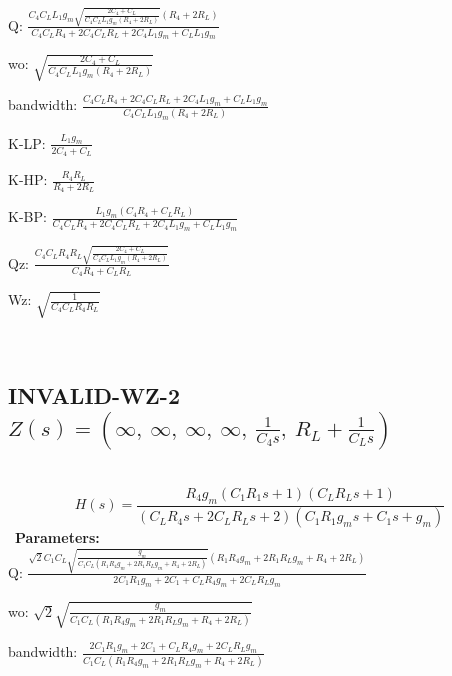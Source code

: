 \documentclass{article}
\begin{document}
Q: $\frac{C_{4} C_{L} L_{1} g_{m} \sqrt{\frac{2 C_{4} + C_{L}}{C_{4} C_{L} L_{1} g_{m} \left(R_{4} + 2 R_{L}\right)}} \left(R_{4} + 2 R_{L}\right)}{C_{4} C_{L} R_{4} + 2 C_{4} C_{L} R_{L} + 2 C_{4} L_{1} g_{m} + C_{L} L_{1} g_{m}}$\ 

wo: $\sqrt{\frac{2 C_{4} + C_{L}}{C_{4} C_{L} L_{1} g_{m} \left(R_{4} + 2 R_{L}\right)}}$\ 

bandwidth: $\frac{C_{4} C_{L} R_{4} + 2 C_{4} C_{L} R_{L} + 2 C_{4} L_{1} g_{m} + C_{L} L_{1} g_{m}}{C_{4} C_{L} L_{1} g_{m} \left(R_{4} + 2 R_{L}\right)}$\ 

K-LP: $\frac{L_{1} g_{m}}{2 C_{4} + C_{L}}$\ 

K-HP: $\frac{R_{4} R_{L}}{R_{4} + 2 R_{L}}$\ 

K-BP: $\frac{L_{1} g_{m} \left(C_{4} R_{4} + C_{L} R_{L}\right)}{C_{4} C_{L} R_{4} + 2 C_{4} C_{L} R_{L} + 2 C_{4} L_{1} g_{m} + C_{L} L_{1} g_{m}}$\ 

Qz: $\frac{C_{4} C_{L} R_{4} R_{L} \sqrt{\frac{2 C_{4} + C_{L}}{C_{4} C_{L} L_{1} g_{m} \left(R_{4} + 2 R_{L}\right)}}}{C_{4} R_{4} + C_{L} R_{L}}$\ 

Wz: $\sqrt{\frac{1}{C_{4} C_{L} R_{4} R_{L}}}$\ 

\ 

\subsection{INVALID-WZ-2 $Z(s) = \left( \infty, \  \infty, \  \infty, \  \infty, \  \frac{1}{C_{4} s}, \  R_{L} + \frac{1}{C_{L} s}\right)$ } \ 
\textbf{\[H(s) = \frac{R_{4} g_{m} \left(C_{1} R_{1} s + 1\right) \left(C_{L} R_{L} s + 1\right)}{\left(C_{L} R_{4} s + 2 C_{L} R_{L} s + 2\right) \left(C_{1} R_{1} g_{m} s + C_{1} s + g_{m}\right)}\] } \ 
\textbf{Parameters:}\\ 

Q: $\frac{\sqrt{2} C_{1} C_{L} \sqrt{\frac{g_{m}}{C_{1} C_{L} \left(R_{1} R_{4} g_{m} + 2 R_{1} R_{L} g_{m} + R_{4} + 2 R_{L}\right)}} \left(R_{1} R_{4} g_{m} + 2 R_{1} R_{L} g_{m} + R_{4} + 2 R_{L}\right)}{2 C_{1} R_{1} g_{m} + 2 C_{1} + C_{L} R_{4} g_{m} + 2 C_{L} R_{L} g_{m}}$\ 

wo: $\sqrt{2} \sqrt{\frac{g_{m}}{C_{1} C_{L} \left(R_{1} R_{4} g_{m} + 2 R_{1} R_{L} g_{m} + R_{4} + 2 R_{L}\right)}}$\ 

bandwidth: $\frac{2 C_{1} R_{1} g_{m} + 2 C_{1} + C_{L} R_{4} g_{m} + 2 C_{L} R_{L} g_{m}}{C_{1} C_{L} \left(R_{1} R_{4} g_{m} + 2 R_{1} R_{L} g_{m} + R_{4} + 2 R_{L}\right)}$\ 
\end{document}
